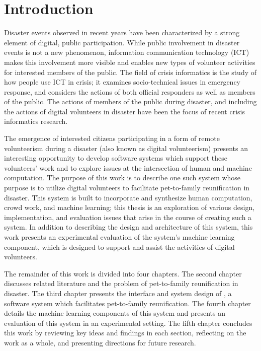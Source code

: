 \chapter{Introduction}
\label{introchap}


Disaster events observed in recent years have been characterized by a strong element of digital, public participation.  While public involvement in disaster events is not a new phenomenon, information communication technology (ICT) \cite{palen:ict} makes this involvement more visible and enables new types of volunteer activities for interested members of the public.  The field of crisis informatics \cite{palen:vision} is the study of how people use ICT in crisis; it examines socio-technical issues in emergency response, and considers the actions of both official responders as well as members of the public.  The actions of members of the public during disaster, and including the actions of digital volunteers \cite{starbird:voluntweeters} in disaster have been the focus of recent crisis informatics research.

The emergence of interested citizens participating in a form of remote volunteerism during a disaster (also known as digital volunteerism) presents an interesting opportunity to develop software systems which support these volunteers' work and to explore issues at the intersection of human and machine computation.  The purpose of this work is to describe one such system whose purpose is to utilize digital volunteers to facilitate pet-to-family reunification in disaster.  This system is built to incorporate and synthesize human computation, crowd work, and machine learning; this thesis is an exploration of various design, implementation, and evaluation issues that arise in the course of creating such a system.  In addition to describing the design and architecture of this system, this work presents an experimental evaluation of the system's machine learning component, which is designed to support and assist the activities of digital volunteers.

The remainder of this work is divided into four chapters.  The second chapter discusses related literature and the problem of pet-to-family reunification in disaster.  The third chapter presents the interface and system design of \nplh, a software system which facilitates pet-to-family reunification.  The fourth chapter details the machine learning components of this system and presents an evaluation of this system in an experimental setting.  The fifth chapter concludes this work by reviewing key ideas and findings in each section, reflecting on the work as a whole, and presenting directions for future research.

